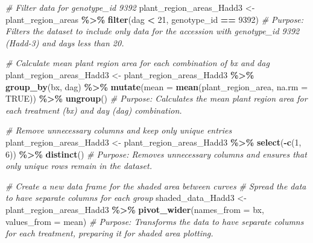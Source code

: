 \documentclass[
  11pt,
]{article}
\newenvironment{Shaded}{\begin{snugshade}}{\end{snugshade}}
\newcommand{\AttributeTok}[1]{\textcolor[rgb]{0.13,0.29,0.53}{#1}}
\newcommand{\CommentTok}[1]{\textcolor[rgb]{0.56,0.35,0.01}{\textit{#1}}}
\newcommand{\ConstantTok}[1]{\textcolor[rgb]{0.56,0.35,0.01}{#1}}
\newcommand{\DecValTok}[1]{\textcolor[rgb]{0.00,0.00,0.81}{#1}}
\newcommand{\FunctionTok}[1]{\textcolor[rgb]{0.13,0.29,0.53}{\textbf{#1}}}
\newcommand{\NormalTok}[1]{#1}
\newcommand{\OtherTok}[1]{\textcolor[rgb]{0.56,0.35,0.01}{#1}}
\newcommand{\SpecialCharTok}[1]{\textcolor[rgb]{0.81,0.36,0.00}{\textbf{#1}}}
\begin{document}
\begin{Shaded}
\begin{Highlighting}[]
\CommentTok{\# Filter data for genotype\_id 9392}
\NormalTok{plant\_region\_areas\_Hadd3 }\OtherTok{\textless{}{-}}\NormalTok{ plant\_region\_areas }\SpecialCharTok{\%\textgreater{}\%} 
  \FunctionTok{filter}\NormalTok{(dag }\SpecialCharTok{\textless{}} \DecValTok{21}\NormalTok{, genotype\_id }\SpecialCharTok{==} \DecValTok{9392}\NormalTok{)}
\CommentTok{\# Purpose: Filters the dataset to include only data for the accession with genotype\_id 9392 (Hadd{-}3) and days less than 20.}

\CommentTok{\# Calculate mean plant region area for each combination of bx and dag}
\NormalTok{plant\_region\_areas\_Hadd3 }\OtherTok{\textless{}{-}}\NormalTok{ plant\_region\_areas\_Hadd3 }\SpecialCharTok{\%\textgreater{}\%}
  \FunctionTok{group\_by}\NormalTok{(bx, dag) }\SpecialCharTok{\%\textgreater{}\%}
  \FunctionTok{mutate}\NormalTok{(}\AttributeTok{mean =} \FunctionTok{mean}\NormalTok{(plant\_region\_area, }\AttributeTok{na.rm =} \ConstantTok{TRUE}\NormalTok{)) }\SpecialCharTok{\%\textgreater{}\%}
  \FunctionTok{ungroup}\NormalTok{()}
\CommentTok{\# Purpose: Calculates the mean plant region area for each treatment (bx) and day (dag) combination.}

\CommentTok{\# Remove unnecessary columns and keep only unique entries}
\NormalTok{plant\_region\_areas\_Hadd3 }\OtherTok{\textless{}{-}}\NormalTok{ plant\_region\_areas\_Hadd3 }\SpecialCharTok{\%\textgreater{}\%}
  \FunctionTok{select}\NormalTok{(}\SpecialCharTok{{-}}\FunctionTok{c}\NormalTok{(}\DecValTok{1}\NormalTok{, }\DecValTok{6}\NormalTok{)) }\SpecialCharTok{\%\textgreater{}\%}
  \FunctionTok{distinct}\NormalTok{()}
\CommentTok{\# Purpose: Removes unnecessary columns and ensures that only unique rows remain in the dataset.}

\CommentTok{\# Create a new data frame for the shaded area between curves}
\CommentTok{\# Spread the data to have separate columns for each group}
\NormalTok{shaded\_data\_Hadd3 }\OtherTok{\textless{}{-}}\NormalTok{ plant\_region\_areas\_Hadd3 }\SpecialCharTok{\%\textgreater{}\%}
  \FunctionTok{pivot\_wider}\NormalTok{(}\AttributeTok{names\_from =}\NormalTok{ bx, }\AttributeTok{values\_from =}\NormalTok{ mean)}
\CommentTok{\# Purpose: Transforms the data to have separate columns for each treatment, preparing it for shaded area plotting.}


\end{Highlighting}
\end{Shaded}
\end{document}
